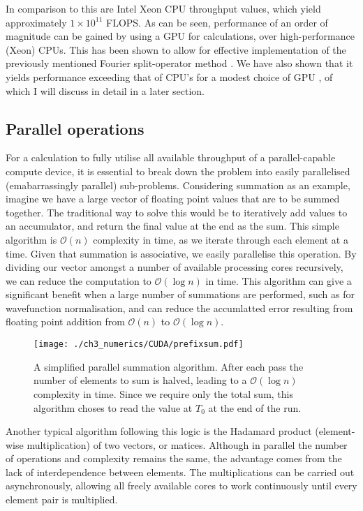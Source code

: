 In comparison to this are Intel Xeon CPU throughput values, which yield approximately $1\times10^{11}$ FLOPS. As can be seen, performance of an order of magnitude can be gained by using a GPU for calculations, over high-performance (Xeon) CPUs. This has been shown to allow for effective implementation of the previously mentioned Fourier split-operator method \cite{Num:Bauke_cpc_2011}. We have also shown that it yields performance exceeding that of CPU's for a modest choice of GPU \cite{AO:Morgan_ORiordan_pra_2013}, of which I will discuss in detail in a later section.

\subsection{Parallel operations}\label{subsec:par_op}
\label{sub:Parallel operations}
For a calculation to fully utilise all available throughput of a parallel-capable
compute device, it is essential to break down the problem into easily parallelised (emabarrassingly parallel) sub-problems. Considering summation as an example, imagine we have a large vector of floating point values that are to be summed together. The traditional way to solve this would be to iteratively add values to an accumulator, and return the final value at the end as the sum. This simple algorithm is $\mathcal{O}(n)$ complexity in time, as we iterate through each element at a time. Given that summation is associative, we easily parallelise this operation. By dividing our vector amongst a number of available processing cores recursively, we can reduce the computation to $\mathcal{O}(\log{} n)$ in time. This algorithm can give a significant benefit when a large number of summations are performed, such as for wavefunction normalisation, and can reduce the accumlatted error resulting from floating point addition from $\mathcal{O}(n)$ to $\mathcal{O}(\log{} n)$.

\begin{figure}
    \centering
    \texttt{[image: ./ch3\_numerics/CUDA/prefixsum.pdf]}
    \caption{A simplified parallel summation algorithm. After each pass the number of elements to sum is halved, leading to a $\mathcal{O}(\log{} n)$ complexity in time. Since we require only the total sum, this algorithm choses to read the value at $T_0$ at the end of the run.}
    \label{fig:prefixsum}
\end{figure}

Another typical algorithm following this logic is the Hadamard product (element-wise multiplication) of two vectors, or matices. Although in parallel the number of operations and complexity remains the same, the advantage comes from the lack of interdependence between elements. The multiplications can be carried out asynchronously, allowing all freely available cores to work continuously until every element pair is multiplied.


